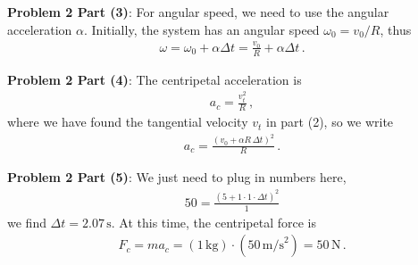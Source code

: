 \documentclass[11pt]{article}
\begin{document}
\textbf{Problem 2 Part (3)}: For angular speed, we need to use the angular acceleration $\alpha$. Initially, the system has an angular speed $\omega_0 = v_0/R$, thus 
\begin{align*}
\omega = \omega_0 + \alpha \Delta t = \frac{v_0}{R} + \alpha \Delta t\,.
\end{align*}

\textbf{Problem 2 Part (4)}: The centripetal acceleration is 
\begin{align*}
a_c = \frac{v_t^2}{R}\,,
\end{align*}
where we have found the tangential velocity $v_t$ in part (2), so we write
\begin{align*}
a_c = \frac{(v_0+\alpha R\,\Delta t)^2}{R}\,.
\end{align*}

\textbf{Problem 2 Part (5)}: We just need to plug in numbers here, 
\begin{align*}
50 = \frac{(5+1\cdot 1\cdot \Delta t)^2}{1}
\end{align*}
we find $\Delta t = 2.07\,\text{s}$. At this time, the centripetal force is
\begin{align*}
F_c = ma_c = (1\,\text{kg})\cdot (50\,\text{m/s}^2) = 50 \,\text{N}\,.
\end{align*}
\end{document}
